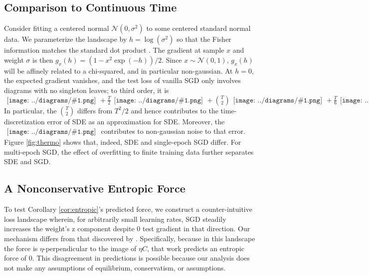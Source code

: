 \documentclass{article}
\newcommand{\Nn}{\mathcal{N}}
\newcommand{\sdia}[1]{\begin{gathered}\texttt{[image: ../diagrams/\#1.png]}\end{gathered}}
\begin{document}
    \subsection{Comparison to Continuous Time}
        Consider fitting a centered normal $\Nn(0, \sigma^2)$ to some centered
        standard normal data.  We parameterize the landscape by
        $h=\log(\sigma^2)$ so that the Fisher information matches the standard
        dot product \citet{am98}.  The gradient at sample $x$ and weight
        $\sigma$ is then $g_x(h) = (1-x^2\exp(-h))/2$.  Since $x\sim \Nn(0,
        1)$, $g_x(h)$ will be affinely related to a chi-squared, and in
        particular non-gaussian.  At $h=0$, the expected gradient vanishes, and
        the test loss of vanilla SGD only involves diagrams with no singleton
        leaves; to third order, it is
        $
            \sdia{(0)()}
            +\frac{T}{2} \sdia{c(01-2)(02-12)}
            +{T\choose 2} \sdia{c(03-1-2)(01-12-23)}
            +\frac{T}{6} \sdia{c(012-3)(03-13-23)}
        $
        In particular, the ${T\choose 2}$ differs from $T^2/2$ and hence
        contributes to the time-discretization error of SDE as an approximation
        for SDE.  Moreover, the $\sdia{c(012-3)(03-13-23)}$ contributes to
        non-gaussian noise to that error.  Figure \ref{fig:thermo} shows that,
        indeed, SDE and single-epoch SGD differ.  For multi-epoch SGD, the
        effect of overfitting to finite training data further separates SDE and
        SGD.


    \subsection{A Nonconservative Entropic Force} \label{subsect:entropic}
        To test Corollary \ref{cor:entropic}'s predicted force, 
        we construct a counter-intuitive loss landscape wherein, for
        arbitrarily small learning rates, SGD steadily increases the weight's
        z component despite 0 test gradient in that direction.
        Our mechanism differs from that discovered by \citet{ch18}.
        Specifically, because in this landscape the force is
        $\eta$-perpendicular to the image of $\eta C$, that work predicts an
        entropic force of $0$.  This disagreement in predictions is possible
        because our analysis does not make any assumptions of equilibrium,
        conservatism, or assumptions.
        
\end{document}
